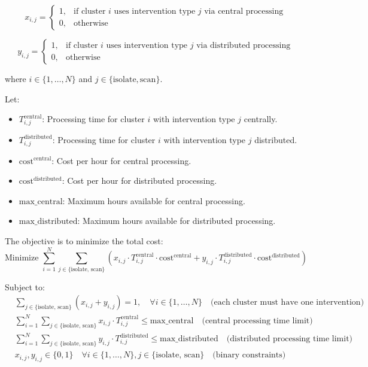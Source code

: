 \documentclass{article}
\begin{document}
\[
x_{i,j} = 
\begin{cases} 
1, & \text{if cluster $i$ uses intervention type $j$ via central processing} \\
0, & \text{otherwise}
\end{cases}
\]

\[
y_{i,j} = 
\begin{cases} 
1, & \text{if cluster $i$ uses intervention type $j$ via distributed processing} \\
0, & \text{otherwise}
\end{cases}
\]

where $i \in \{1, \ldots, N\}$ and $j \in \{\text{isolate}, \text{scan}\}$.

Let:
\begin{itemize}
    \item $T_{i,j}^{\text{central}}$: Processing time for cluster $i$ with intervention type $j$ centrally.
    \item $T_{i,j}^{\text{distributed}}$: Processing time for cluster $i$ with intervention type $j$ distributed.
    \item $\text{cost}^{\text{central}}$: Cost per hour for central processing.
    \item $\text{cost}^{\text{distributed}}$: Cost per hour for distributed processing.
    \item $\text{max\_central}$: Maximum hours available for central processing.
    \item $\text{max\_distributed}$: Maximum hours available for distributed processing.
\end{itemize}

The objective is to minimize the total cost:
\[
\text{Minimize } \sum_{i=1}^{N} \sum_{j \in \{\text{isolate, scan}\}} \left( x_{i,j} \cdot T_{i,j}^{\text{central}} \cdot \text{cost}^{\text{central}} + y_{i,j} \cdot T_{i,j}^{\text{distributed}} \cdot \text{cost}^{\text{distributed}} \right)
\]

Subject to:
\begin{align}
& \sum_{j \in \{\text{isolate, scan}\}} (x_{i,j} + y_{i,j}) = 1, \quad \forall i \in \{1, \ldots, N\} \quad \text{(each cluster must have one intervention)} \\
& \sum_{i=1}^{N} \sum_{j \in \{\text{isolate, scan}\}} x_{i,j} \cdot T_{i,j}^{\text{central}} \leq \text{max\_central} \quad \text{(central processing time limit)} \\
& \sum_{i=1}^{N} \sum_{j \in \{\text{isolate, scan}\}} y_{i,j} \cdot T_{i,j}^{\text{distributed}} \leq \text{max\_distributed} \quad \text{(distributed processing time limit)} \\
& x_{i,j}, y_{i,j} \in \{0, 1\} \quad \forall i \in \{1, \ldots, N\}, j \in \{\text{isolate, scan}\} \quad \text{(binary constraints)}
\end{align}
\end{document}
